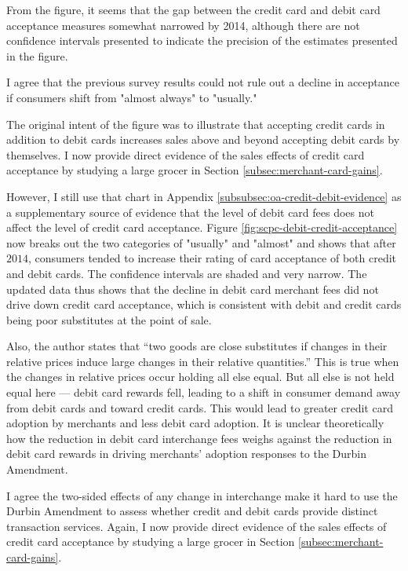 \documentclass[main.tex]{subfiles}
\begin{document}
\begin{refsection}
\begin{refcommentnoclear}
From the figure, it seems that the gap between the credit card and debit card acceptance measures somewhat narrowed by 2014, although there are not confidence intervals presented to indicate the precision of the estimates presented in the figure.
\end{refcommentnoclear}

I agree that the previous survey results could not rule out a decline in acceptance if consumers shift from "almost always" to "usually." 

The original intent of the figure was to illustrate that accepting credit cards in addition to debit cards increases sales above and beyond accepting debit cards by themselves.
I now provide direct evidence of the sales effects of credit card acceptance by studying a large grocer in Section \ref{subsec:merchant-card-gains}.

However, I still use that chart in Appendix \ref{subsubsec:oa-credit-debit-evidence} as a supplementary source of evidence that the level of debit card fees does not affect the level of credit card acceptance.
Figure \ref{fig:scpc-debit-credit-acceptance} now breaks out the two categories of "usually" and "almost" and shows that after $2014$, consumers tended to increase their rating of card acceptance of both credit and debit cards.
The confidence intervals are shaded and very narrow.
The updated data thus shows that the decline in debit card merchant fees did not drive down credit card acceptance, which is consistent with debit and credit cards being poor substitutes at the point of sale.

\begin{refcommentnoclear}
Also, the author states that “two goods are close substitutes if changes in their relative prices induce large changes in their relative quantities.” This is true when the changes in relative prices occur holding all else equal.
But all else is not held equal here — debit card rewards fell, leading to a shift in consumer demand away from debit cards and toward credit cards.
This would lead to greater credit card adoption by merchants and less debit card adoption.
It is unclear theoretically how the reduction in debit card interchange fees weighs against the reduction in debit card rewards in driving merchants' adoption responses to the Durbin Amendment.
\end{refcommentnoclear}

I agree the two-sided effects of any change in interchange make it hard to use the Durbin Amendment to assess whether credit and debit cards provide distinct transaction services.
Again, I now provide direct evidence of the sales effects of credit card acceptance by studying a large grocer in Section \ref{subsec:merchant-card-gains}.


\end{refsection}
\end{document}

